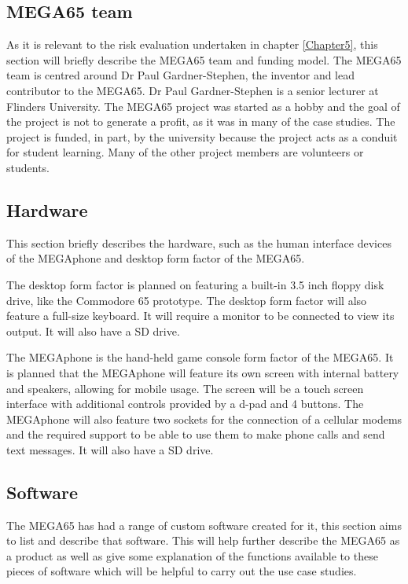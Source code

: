 \subsection{MEGA65 team}
As it is relevant to the risk evaluation undertaken in chapter \ref{Chapter5}, this section will briefly describe the MEGA65 team and funding model. The MEGA65 team is centred around Dr Paul Gardner-Stephen, the inventor and lead contributor to the MEGA65. Dr Paul Gardner-Stephen is a senior lecturer at Flinders University. The MEGA65 project was started as a hobby and the goal of the project is not to generate a profit, as it was in many of the case studies. The project is funded, in part, by the university because the project acts as a conduit for student learning. Many of the other project members are volunteers or students.

\subsection{Hardware}
This section briefly describes the hardware, such as the human interface devices of the MEGAphone and desktop form factor of the MEGA65. 

The desktop form factor is planned on featuring a built-in 3.5 inch floppy disk drive, like the Commodore 65 prototype. The desktop form factor will also feature a full-size keyboard. It will require a monitor to be connected to view its output. It will also have a SD drive.

The MEGAphone is the hand-held game console form factor of the MEGA65. It is planned that the MEGAphone will feature its own screen with internal battery and speakers, allowing for mobile usage. The screen will be a touch screen interface with additional controls provided by a d-pad and 4 buttons. The MEGAphone will also feature two sockets for the connection of a cellular modems and the required support to be able to use them to make phone calls and send text messages. It will also have a SD drive.  

\subsection{Software}
The MEGA65 has had a range of custom software created for it, this section aims to list and describe that software. This will help further describe the MEGA65 as a product as well as give some explanation of the functions available to these pieces of software which will be helpful to carry out the use case studies.\\

